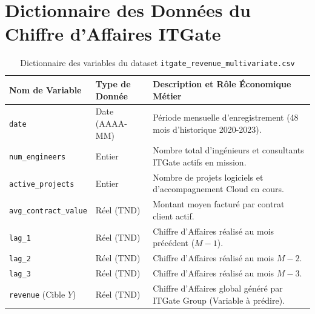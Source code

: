\documentclass[11pt,a4paper,oneside]{report}
\begin{document}
\chapter{Dictionnaire des Données du Chiffre d'Affaires ITGate}

\begin{table}[htbp]
\centering
\small
{}
\begin{tabularx}{\textwidth}{@{}llX@{}}
\toprule
\textbf{Nom de Variable} & \textbf{Type de Donnée} & \textbf{Description et Rôle Économique Métier} \\ \midrule
\texttt{date} & Date (AAAA-MM) & Période mensuelle d'enregistrement (48 mois d'historique 2020-2023). \\
\texttt{num\_engineers} & Entier & Nombre total d'ingénieurs et consultants ITGate actifs en mission. \\
\texttt{active\_projects} & Entier & Nombre de projets logiciels et d'accompagnement Cloud en cours. \\
\texttt{avg\_contract\_value} & Réel (TND) & Montant moyen facturé par contrat client actif. \\
\texttt{lag\_1} & Réel (TND) & Chiffre d'Affaires réalisé au mois précédent ($M-1$). \\
\texttt{lag\_2} & Réel (TND) & Chiffre d'Affaires réalisé au mois $M-2$. \\
\texttt{lag\_3} & Réel (TND) & Chiffre d'Affaires réalisé au mois $M-3$. \\
\texttt{revenue} (Cible $Y$) & Réel (TND) & Chiffre d'Affaires global généré par ITGate Group (Variable à prédire). \\ \bottomrule
\end{tabularx}
\caption{Dictionnaire des variables du dataset \texttt{itgate\_revenue\_multivariate.csv}}
\label{tab:dict_data}
\end{table}

\newpage
\end{document}
